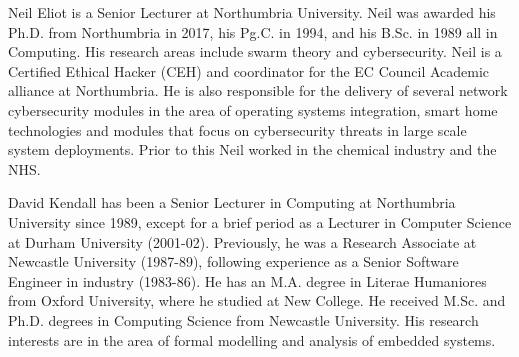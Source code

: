 \documentclass{ieeeaccess}
\begin{document}



\begin{IEEEbiography}{Neil Eliot}
is a Senior Lecturer at Northumbria University.  Neil was awarded his Ph.D. from Northumbria in 2017, his Pg.C. in 1994, and his B.Sc. in 1989 all in Computing. His research areas include swarm theory and cybersecurity. Neil is a Certified Ethical Hacker (CEH) and coordinator for the EC Council Academic alliance at Northumbria. He is also responsible for the delivery of several network cybersecurity modules in the area of operating systems integration, smart home technologies and modules that focus on cybersecurity threats in large scale system deployments. Prior to this Neil worked in the chemical industry and the NHS.
\end{IEEEbiography}

\begin{IEEEbiography}{David Kendall}
has been a Senior Lecturer in Computing at Northumbria University since 1989, except for a brief period as a Lecturer in Computer Science at Durham University (2001-02). Previously, he was a Research Associate at Newcastle University (1987-89), following experience as a Senior Software Engineer in industry (1983-86). He has an M.A. degree in Literae Humaniores from Oxford University, where he studied at New College. He received M.Sc. and Ph.D. degrees in Computing Science from Newcastle University. His research interests are in the area of formal modelling and analysis of embedded systems. 
\end{IEEEbiography}
\end{document}
